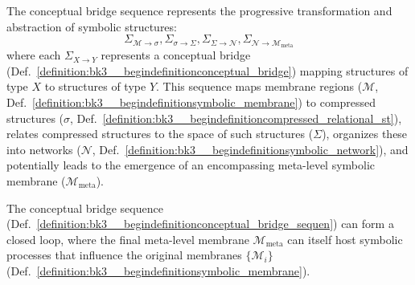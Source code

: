\begin{definition} \label{definition:bk3__begindefinitionconceptual_bridge_sequen}
The conceptual bridge sequence represents the progressive transformation and abstraction of symbolic structures:
\[
\Sigma_{\mathcal{M} \rightarrow \sigma}, \Sigma_{\sigma \rightarrow \Sigma}, \Sigma_{\Sigma \rightarrow \mathcal{N}}, \Sigma_{\mathcal{N} \rightarrow \mathcal{M}_{\text{meta}}}
\]
where each $\Sigma_{X \rightarrow Y}$ represents a conceptual bridge (Def.~\ref{definition:bk3__begindefinitionconceptual_bridge}) mapping structures of type $X$ to structures of type $Y$. This sequence maps membrane regions ($\mathcal{M}$, Def.~\ref{definition:bk3__begindefinitionsymbolic_membrane}) to compressed structures ($\sigma$, Def.~\ref{definition:bk3__begindefinitioncompressed_relational_st}), relates compressed structures to the space of such structures ($\Sigma$), organizes these into networks ($\mathcal{N}$, Def.~\ref{definition:bk3__begindefinitionsymbolic_network}), and potentially leads to the emergence of an encompassing meta-level symbolic membrane ($\mathcal{M}_{\text{meta}}$).
\end{definition}

\begin{theorem} \label{thm:bk3_closure_conceptual_bridge_sequence}
The conceptual bridge sequence (Def.~\ref{definition:bk3__begindefinitionconceptual_bridge_sequen}) can form a closed loop, where the final meta-level membrane $\mathcal{M}_{\text{meta}}$ can itself host symbolic processes that influence the original membranes $\{\mathcal{M}_i\}$ (Def.~\ref{definition:bk3__begindefinitionsymbolic_membrane}).
\end{theorem}

